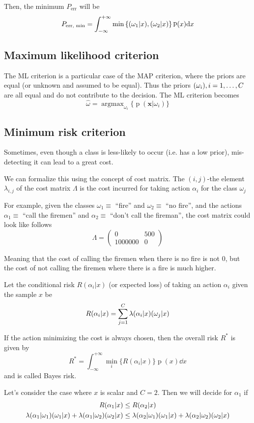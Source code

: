 \documentclass[oneside,onecolumn]{report}
\DeclareMathOperator*{\argmax}{argmax}
\DeclareMathOperator*{\pdf}{p}
\let\P\relax
\DeclareMathOperator*{\P}{P}
\begin{document}
Then, the minimum $P_\text{err}$ will be
$$ P_\text{err, min} = \int_{-\infty}^{+\infty} \min\left\{ \P(\omega_1 | x), \P(\omega_2 | x) \right\} \pdf(x) \dd x $$


\subsection{Maximum likelihood criterion}
The ML criterion is a particular case of the MAP criterion, where the priors are equal (or unknown and assumed to be equal).
Thus the priors $\P(\omega_i), i = 1, \dots, C$ are all equal and do not contribute to the decision.
The ML criterion becomes
$$ \widehat \omega = \argmax_{\omega_i} \{ \pdf(\bm x | \omega_i) \} $$

\subsection{Minimum risk criterion}
Sometimes, even though a class is less-likely to occur (i.e. has a low prior), mis-detecting it can lead to a great cost.

We can formalize this using the concept of cost matrix.
The $(i,j)$-the element $\lambda_{i,j}$ of the cost matrix $\Lambda$ is the cost incurred for taking action $\alpha_i$ for the class $\omega_j$

For example, given the classes $\omega_1 \equiv$ ``fire'' and $\omega_2 \equiv$ ``no fire'', and the actions $\alpha_1 \equiv$ ``call the firemen'' and $\alpha_2 \equiv$ ``don't call the fireman'', the cost matrix could look like follows
$$ \Lambda = \begin{pmatrix}
    0 & 500 \\
    1000000 & 0
\end{pmatrix} $$

Meaning that the cost of calling the firemen when there is no fire is not 0, but the cost of not calling the firemen where there is a fire is much higher.

Let the conditional risk $R(\alpha_i | x)$ (or expected loss) of taking an action $\alpha_i$ given the sample $x$ be
$$ R(\alpha_i | x) = \sum_{j = 1}^C \lambda(\alpha_i | x) \P(\omega_j | x) $$

If the action minimizing the cost is always chosen, then the overall risk $R^*$ is given by
$$ R^* = \int_{-\infty}^{+\infty} \min_i\{R(\alpha_i | x)\} \pdf(x) \dd x $$
and is called Bayes risk.

Let's consider the case where $x$ is scalar and $C = 2$.
Then we will decide for $\alpha_1$ if
\begin{gather*}
    R(\alpha_1 | x) \leq R(\alpha_2 | x) \\
    \lambda(\alpha_1 | \omega_1) \P(\omega_1 | x) + \lambda(\alpha_1 | \omega_2) \P(\omega_2 | x) \leq \lambda(\alpha_2 | \omega_1) \P(\omega_1 | x) + \lambda(\alpha_2 | \omega_2) \P(\omega_2 | x)
\end{gather*}
\end{document}
